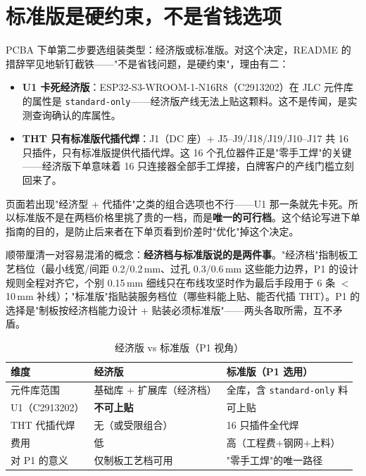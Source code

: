 \section{标准版是硬约束，不是省钱选项}
\label{sec:fab-standard}

PCBA 下单第二步要选组装类型：经济版或标准版。对这个决定，README 的措辞罕见地斩钉截铁——"不是省钱问题，是硬约束"，理由有二：

\begin{itemize}
  \item \textbf{U1 卡死经济版}：ESP32-S3-WROOM-1-N16R8（C2913202）在 JLC 元件库的属性是 \texttt{standard-only}——经济版产线无法上贴这颗料。这不是传闻，是实测查询确认的库属性。
  \item \textbf{THT 只有标准版代插代焊}：J1（DC 座）+ J5--J9/J18/J19/J10--J17 共 16 只插件，只有标准版提供代插代焊。这 16 个孔位器件正是"零手工焊"的关键——经济版下单意味着 16 只连接器全部手工焊接，白牌客户的产线门槛立刻回来了。
\end{itemize}

页面若出现"经济型 + 代插件"之类的组合选项也不行——U1 那一条就先卡死。所以标准版不是在两档价格里挑了贵的一档，而是\textbf{唯一的可行档}。这个结论写进下单指南的目的，是防止后来者在下单页看到价差时"优化"掉这个决定。

顺带厘清一对容易混淆的概念：\textbf{经济档与标准版说的是两件事}。"经济档"指制板工艺档位（最小线宽/间距 0.2/0.2\,mm、过孔 0.3/0.6\,mm 这些能力边界，P1 的设计规则全程对齐它，个别 0.15\,mm 细线只在布线攻坚时作为最后手段用于 6 条 $<$10\,mm 补线）；"标准版"指贴装服务档位（哪些料能上贴、能否代插 THT）。P1 的选择是"制板按经济档能力设计 + 贴装必须标准版"——两头各取所需，互不矛盾。

\begin{table}[htbp]
  \centering
  \caption{经济版 vs 标准版（P1 视角）}
  \label{tab:fab-tiers}
  \begin{tabular}{lp{4.5cm}p{4.5cm}}
    \toprule
    维度 & 经济版 & 标准版（P1 选用） \\
    \midrule
    元件库范围 & 基础库 + 扩展库（经济档） & 全库，含 \texttt{standard-only} 料 \\
    U1（C2913202） & \textbf{不可上贴} & 可上贴 \\
    THT 代插代焊 & 无（或受限组合） & 16 只插件全代焊 \\
    费用 & 低 & 高（工程费+钢网+上料） \\
    对 P1 的意义 & 仅制板工艺档可用 & "零手工焊"的唯一路径 \\
    \bottomrule
  \end{tabular}
\end{table}

